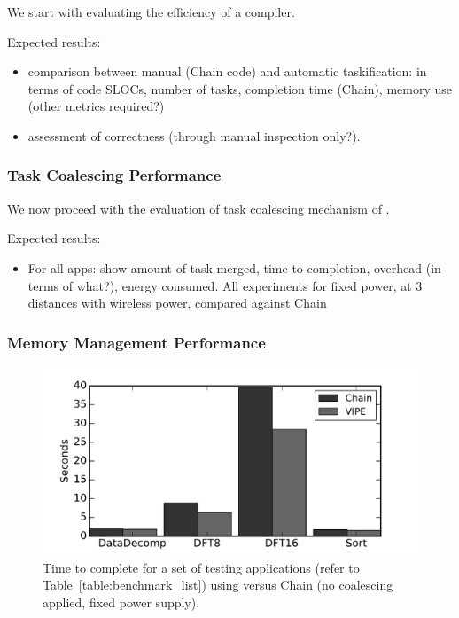 We start with evaluating the efficiency of a \sys compiler. 

Expected results:
\begin{itemize}
	\item comparison between manual (Chain code) and automatic taskification: in terms of code SLOCs, number of tasks, completion time (Chain), memory use (other metrics required?)
	\item assessment of correctness (through manual inspection only?).
\end{itemize}


\subsubsection{Task Coalescing Performance}
\label{sec:results_coalescing}

We now proceed with the evaluation of task coalescing mechanism of \sys.

Expected results:
\begin{itemize}
	\item For all apps: show amount of task merged, time to completion, overhead (in terms of what?), energy consumed. All experiments for fixed power, at 3 distances with wireless power, compared against Chain 
\end{itemize} 


\subsubsection{Memory Management Performance}
\label{sec:results_memory_management}

\begin{figure}
	\centering
	\includegraphics[width=\columnwidth]{figures/chain_vipe}
	\caption{Time to complete for a set of testing applications (refer to Table~\ref{table:benchmark_list}) using \sys versus Chain (no coalescing applied, fixed power supply). }
	\label{fig:IPOSPerformance}
\end{figure}

